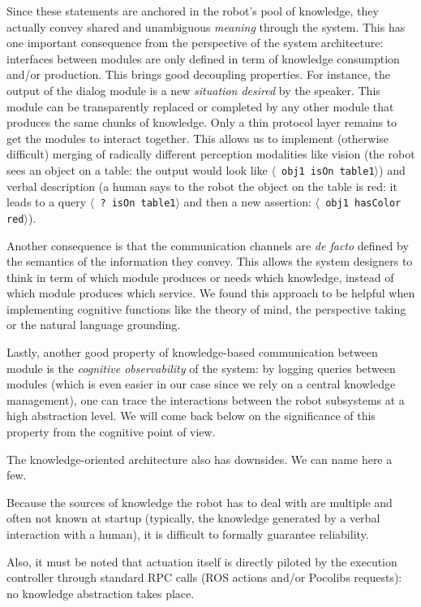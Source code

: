 \documentclass[letterpaper, 10 pt, conference]{ieeeconf}  %
\newcommand{\stmt}[1]{{\footnotesize \tt $\langle$ #1\relax$\rangle$}}
\begin{document}
Since these statements are anchored in the robot's pool of knowledge, they
actually convey shared and unambiguous \emph{meaning} through the system. This
has one important consequence from the perspective of the system architecture:
interfaces between modules are only defined in term of knowledge consumption and/or
production. This brings good decoupling properties. For instance, the output of
the dialog module is a new \emph{situation desired} by the speaker. This module
can be transparently replaced or completed by any other module that produces
the same chunks of knowledge. Only a thin protocol layer remains to get the
modules to interact together. This allows us to implement (otherwise difficult)
merging of radically different perception modalities like vision (the robot
sees an object on a table: the output would look like \stmt{obj1 isOn table1})
and verbal description (a human says to the robot the object on the table
is red: it leads to a query \stmt{? isOn table1} and then a new assertion:
\stmt{obj1 hasColor red}).

Another consequence is that the communication channels are {\it
de facto} defined by the semantics of the information they
convey. This allows the system designers to think in term of which module
produces or needs which knowledge, instead of which module produces which
service. We found this approach to be helpful when implementing cognitive
functions like the theory of mind, the perspective taking or the natural
language grounding.

Lastly, another good property of knowledge-based communication between module
is the \emph{cognitive observability} of the system: by logging queries between
modules (which is even easier in our case since we rely on a central knowledge
management), one can trace the interactions between the robot subsystems at a high
abstraction level. We will come back below on the significance of this property
from the cognitive point of view.

The knowledge-oriented architecture also has downsides. We can name here a few.

Because the sources of knowledge the robot has to deal with are multiple and
often not known at startup (typically, the knowledge generated by a verbal
interaction with a human), it is difficult to formally guarantee reliability.

Also, it must be noted that actuation itself is directly piloted by the
execution controller through standard RPC calls (ROS actions and/or Pocolibs
requests): no knowledge abstraction takes place.
\end{document}
